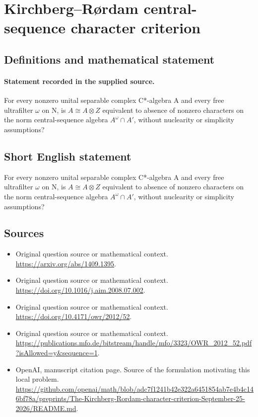 \documentclass[11pt]{article}
\begin{document}
\section*{Kirchberg–Rørdam central-sequence character criterion}\label{statement}
\subsection{Definitions and mathematical statement}
\paragraph{Statement recorded in the supplied source.}
For every nonzero unital separable complex C*-algebra A and every free ultrafilter $\omega $ on N, is $A\cong A\otimes Z$ equivalent to absence of nonzero characters on the norm central-sequence algebra $A^\omega \cap A\prime $, without nuclearity or simplicity assumptions?
\subsection{Short English statement}
For every nonzero unital separable complex C*-algebra A and every free ultrafilter $\omega $ on N, is $A\cong A\otimes Z$ equivalent to absence of nonzero characters on the norm central-sequence algebra $A^\omega \cap A\prime $, without nuclearity or simplicity assumptions?
\subsection{Sources}
\begin{itemize}
\item[S1] Original question source or mathematical context.
\url{https://arxiv.org/abs/1409.1395}.
\item[S2] Original question source or mathematical context.
\url{https://doi.org/10.1016/j.aim.2008.07.002}.
\item[S3] Original question source or mathematical context.
\url{https://doi.org/10.4171/owr/2012/52}.
\item[S4] Original question source or mathematical context.
\url{https://publications.mfo.de/bitstream/handle/mfo/3323/OWR_2012_52.pdf?isAllowed=y&sequence=1}.
\item[S5] OpenAI, manuscript citation page. Source of the formulation motivating this local problem.
\url{https://github.com/openai/math/blob/adc7f1241b42e322a6451854ab7e4b4c146bf78a/preprints/The-Kirchberg-Rordam-character-criterion-September-25-2026/README.md}.
\end{itemize}
\end{document}
